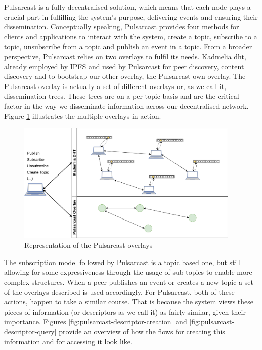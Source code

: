 Pulsarcast is a fully decentralised solution, which means that each node plays
a crucial part in fulfilling the system's purpose, delivering events and
ensuring their dissemination. Conceptually speaking, Pulsarcast provides four
methods for clients and applications to interact with the system, create a
topic, subscribe to a topic, unsubscribe from a topic and publish an event in a
topic. From a broader perspective, Pulsarcast relies on two overlays to fulfil
its needs. Kadmelia \acrshort{dht}, already employed by IPFS and used by
Pulsarcast for peer discovery, content discovery and to bootstrap our other
overlay, the Pulsarcast own overlay. The Pulsarcast overlay is actually a set of
different overlays or, as we call it, dissemination trees.  These trees are on
a per topic basis and are the critical factor in the way we disseminate
information across our decentralised network.  Figure
\ref{fig:pulsarcast-overlays} illustrates the multiple overlays in action.

\begin{figure}[hb!]
  \centering
  \includegraphics[width=0.95\textwidth]{img/pulsarcast-overlays.png}
  \caption{Representation of the Pulsarcast overlays}
  \label{fig:pulsarcast-overlays}
\end{figure}

The subscription model followed by Pulsarcast is a topic based one, but still
allowing for some expressiveness through the usage of sub-topics to enable more
complex structures. When a peer publishes an event or creates a new topic a set
of the overlays described is used accordingly. For Pulsarcast, both of these
actions, happen to take a similar course. That is because the system views
these pieces of information (or descriptors as we call it) as fairly similar,
given their importance. Figures \ref{fig:pulsarcast-descriptor-creation} and
\ref{fig:pulsarcast-descriptor-query} provide an overview of how the flows for
creating this information and for accessing it look like.

